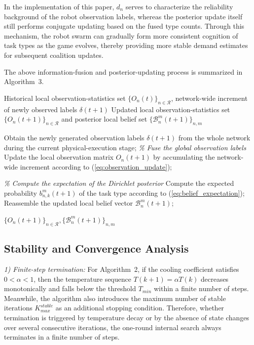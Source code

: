 \documentclass[journal,twoside,web]{ieeecolor}
\begin{document}
In the implementation of this paper, $d_n$ serves to characterize the reliability background of the robot observation labels, whereas the posterior update itself still performs conjugate updating based on the fused type counts. Through this mechanism, the robot swarm can gradually form more consistent cognition of task types as the game evolves, thereby providing more stable demand estimates for subsequent coalition updates.

The above information-fusion and posterior-updating process is summarized in Algorithm~3.
\begin{algorithm}[!t]
\caption{Distributed information fusion and local belief updating}
\label{alg:belief_updating}
\begin{algorithmic}[1]
\REQUIRE Historical local observation-statistics set $\{O_n(t)\}_{n \in \mathcal{R}}$, network-wide increment of newly observed labels $\delta(t+1)$
\ENSURE Updated local observation-statistics set $\{O_n(t+1)\}_{n \in \mathcal{R}}$ and posterior local belief set $\{\mathcal{B}_n^m(t+1)\}_{n,m}$

\STATE {}
    \STATE Obtain the newly generated observation labels $\delta(t+1)$ from the whole network during the current physical-execution stage;
        \STATE \textit{\% Fuse the global observation labels}
        \STATE Update the local observation matrix $O_n(t+1)$ by accumulating the network-wide increment according to (\ref{eq:observation_update});

        \STATE \textit{\% Compute the expectation of the Dirichlet posterior}
            \STATE Compute the expected probability $b_{n,k}^m(t+1)$ of the task type according to (\ref{eq:belief_expectation});
        \ENDFOR
        \STATE Reassemble the updated local belief vector $\mathcal{B}_n^m(t+1)$;
    \ENDFOR
\ENDFOR

\RETURN $\{O_n(t+1)\}_{n \in \mathcal{R}}, \{\mathcal{B}_n^m(t+1)\}_{n,m}$
\end{algorithmic}
\end{algorithm}

\subsection{Stability and Convergence Analysis}

\noindent\textit{1) Finite-step termination:} For Algorithm~2, if the cooling coefficient satisfies $0 < \alpha < 1$, then the temperature sequence $T(k+1)=\alpha T(k)$ decreases monotonically and falls below the threshold $T_{min}$ within a finite number of steps. Meanwhile, the algorithm also introduces the maximum number of stable iterations $K_{max}^{stable}$ as an additional stopping condition. Therefore, whether termination is triggered by temperature decay or by the absence of state changes over several consecutive iterations, the one-round internal search always terminates in a finite number of steps.
\end{document}
